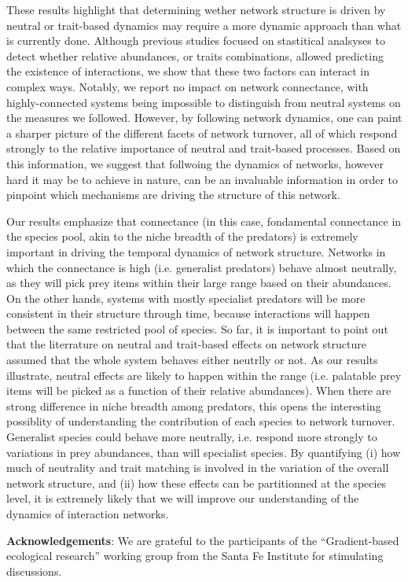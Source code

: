 \documentclass[10pt,twocolumn,fleqn]{article}
\begin{document}
These results highlight that determining wether network structure is driven by
neutral or trait-based dynamics may require a more dynamic approach than what is
currently done. Although previous studies focused on stastitical analsyses to
detect whether relative abundances, or traits combinations, allowed predicting
the existence of interactions, we show that these two factors can interact in
complex ways. Notably, we report no impact on network connectance, with
highly-connected systems being impossible to distinguish from neutral systems on
the measures we followed. However, by following network dynamics, one can paint
a sharper picture of the different facets of network turnover, all of which
respond strongly to the relative importance of neutral and trait-based
processes. Based on this information, we suggest that follwoing the dynamics of
networks, however hard it may be to achieve in nature, can be an invaluable
information in order to pinpoint which mechanisms are driving the structure of
this network.

Our results emphasize that connectance (in this case, fondamental connectance in
the species pool, akin to the niche breadth of the predators) is extremely
important in driving the temporal dynamics of network structure. Networks in
which the connectance is high (i.e. generalist predators) behave almost
neutrally, as they will pick prey items within their large range based on their
abundances. On the other hands, systems with mostly specialist predators will be
more consistent in their structure through time, because interactions will
happen between the same restricted pool of species. So far, it is important to
point out that the literrature on neutral and trait-based effects on network
structure assumed that the whole system behaves either neutrlly or not. As our
results illustrate, neutral effects are likely to happen within the range (i.e.
palatable prey items will be picked as a function of their relative abundances).
When there are strong difference in niche breadth among predators, this opens
the interesting possiblity of understanding the contribution of each species to
network turnover. Generalist species could behave more neutrally, i.e. respond
more strongly to variations in prey abundances, than will specialist species. By
quantifying (i) how much of neutrality and trait matching is involved in the
variation of the overall network structure, and (ii) how these effects can be
partitionned at the species level, it is extremely likely that we will improve
our understanding of the dynamics of interaction networks.

\textbf{Acknowledgements}: We are grateful to the participants of the
``Gradient-based ecological research'' working group from the Santa Fe Institute
for stimulating discussions.

\printbibliography
\end{document}
